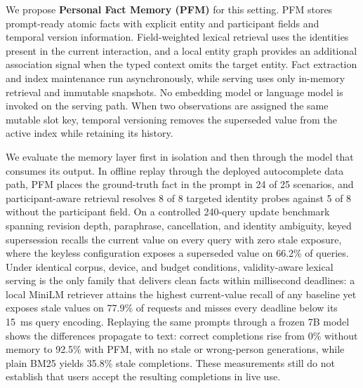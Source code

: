 \documentclass[letterpaper]{article} %
\begin{document}
We propose \textbf{Personal Fact Memory (PFM)} for this setting. PFM stores prompt-ready atomic facts with explicit entity and participant fields and temporal version information. Field-weighted lexical retrieval uses the identities present in the current interaction, and a local entity graph provides an additional association signal when the typed context omits the target entity. Fact extraction and index maintenance run asynchronously, while serving uses only in-memory retrieval and immutable snapshots. No embedding model or language model is invoked on the serving path. When two observations are assigned the same mutable slot key, temporal versioning removes the superseded value from the active index while retaining its history.

We evaluate the memory layer first in isolation and then through the model that consumes its output. In offline replay through the deployed autocomplete data path, PFM places the ground-truth fact in the prompt in 24 of 25 scenarios, and participant-aware retrieval resolves 8 of 8 targeted identity probes against 5 of 8 without the participant field. On a controlled 240-query update benchmark spanning revision depth, paraphrase, cancellation, and identity ambiguity, keyed supersession recalls the current value on every query with zero stale exposure, where the keyless configuration exposes a superseded value on 66.2\% of queries. Under identical corpus, device, and budget conditions, validity-aware lexical serving is the only family that delivers clean facts within millisecond deadlines: a local MiniLM retriever attains the highest current-value recall of any baseline yet exposes stale values on 77.9\% of requests and misses every deadline below its 15~ms query encoding. Replaying the same prompts through a frozen 7B model shows the differences propagate to text: correct completions rise from 0\% without memory to 92.5\% with PFM, with no stale or wrong-person generations, while plain BM25 yields 35.8\% stale completions. These measurements still do not establish that users accept the resulting completions in live use.
\end{document}

